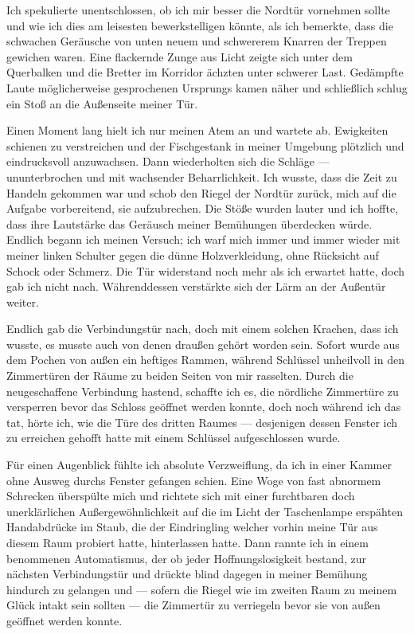 Ich spekulierte unentschlossen, ob ich mir besser die Nordtür vornehmen sollte und wie ich dies am leisesten bewerkstelligen könnte, als ich bemerkte, dass die schwachen Geräusche von unten neuem und schwererem Knarren der Treppen gewichen waren. Eine flackernde Zunge aus Licht zeigte sich unter dem Querbalken und die Bretter im Korridor ächzten unter schwerer Last. Gedämpfte Laute möglicherweise gesprochenen Ursprungs kamen näher und schließlich schlug ein Stoß an die Außenseite meiner Tür.

Einen Moment lang hielt ich nur meinen Atem an und wartete ab. Ewigkeiten schienen zu verstreichen und der Fischgestank in meiner Umgebung plötzlich und eindrucksvoll anzuwachsen. Dann wiederholten sich die Schläge --- ununterbrochen und mit wachsender Beharrlichkeit. Ich wusste, dass die Zeit zu Handeln gekommen war und schob den Riegel der Nordtür zurück, mich auf die Aufgabe vorbereitend, sie aufzubrechen. Die Stöße wurden lauter und ich hoffte, dass ihre Lautstärke das Geräusch meiner Bemühungen überdecken würde. Endlich begann ich meinen Versuch; ich warf mich immer und immer wieder mit meiner linken Schulter gegen die dünne Holzverkleidung, ohne Rücksicht auf Schock oder Schmerz. Die Tür widerstand noch mehr als ich erwartet hatte, doch gab ich nicht nach. Währenddessen verstärkte sich der Lärm an der Außentür weiter.

Endlich gab die Verbindungstür nach, doch mit einem solchen Krachen, dass ich wusste, es musste auch von denen draußen gehört worden sein. Sofort wurde aus dem Pochen von außen ein heftiges Rammen, während Schlüssel unheilvoll in den Zimmertüren der Räume zu beiden Seiten von mir rasselten. Durch die neugeschaffene Verbindung hastend, schaffte ich es, die nördliche Zimmertüre zu versperren bevor das Schloss geöffnet werden konnte, doch noch während ich das tat, hörte ich, wie die Türe des dritten Raumes --- desjenigen dessen Fenster ich zu erreichen gehofft hatte mit einem Schlüssel aufgeschlossen wurde.

Für einen Augenblick fühlte ich absolute Verzweiflung, da ich in einer Kammer ohne Ausweg durchs Fenster gefangen schien. Eine Woge von fast abnormem Schrecken überspülte mich und richtete sich mit einer furchtbaren doch unerklärlichen Außergewöhnlichkeit auf die im Licht der Taschenlampe erspähten Handabdrücke im Staub, die der Eindringling welcher vorhin meine Tür aus diesem Raum probiert hatte, hinterlassen hatte. Dann rannte ich in einem benommenen Automatismus, der ob jeder Hoffnungslosigkeit bestand, zur nächsten Verbindungstür und drückte blind dagegen in meiner Bemühung hindurch zu gelangen und --- sofern die Riegel wie im zweiten Raum zu meinem Glück intakt sein sollten --- die Zimmertür zu verriegeln bevor sie von außen geöffnet werden konnte.

